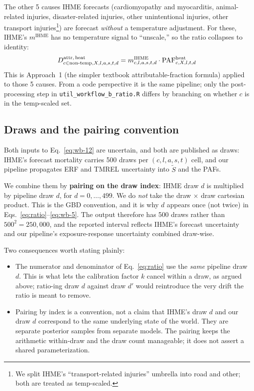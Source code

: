 \documentclass[11pt]{article}
\newcommand{\PAF}{\text{PAF}}
\newcommand{\mIHME}{m^{\text{IHME}}}
\begin{document}
The other 5 causes IHME forecasts (cardiomyopathy and myocarditis,
animal-related injuries, disaster-related injuries, other unintentional
injuries, other transport injuries\footnote{We split IHME's
``transport-related injuries'' umbrella into road and other; both are
treated as temp-scaled.}) are forecast \emph{without} a temperature
adjustment. For these, IHME's $\mIHME$ has no temperature signal to
``unscale,'' so the ratio collapses to identity:
\begin{equation}
\mAttr[heat]_{c \in \text{non-temp}, X, l, a, s, t, d}
= \mIHME_{c,l,a,s,t,d} \cdot \PAF^{\text{heat}}_{c,X,l,t,d}
\label{eq:wb-5}
\end{equation}
This is Approach~1 (the simpler textbook attributable-fraction formula)
applied to those 5 causes. From a code perspective it is the same
pipeline; only the post-processing step in
\texttt{util\_workflow\_b\_ratio.R} differs by branching on whether
$c$ is in the temp-scaled set.

\subsection{Draws and the pairing convention}
\label{sec:draws}

Both inputs to Eq.~\eqref{eq:wb-12} are uncertain, and both are published
as draws: IHME's forecast mortality carries 500 draws per
$(c, l, a, s, t)$ cell, and our pipeline propagates ERF and TMREL
uncertainty into $\tilde S$ and the PAFs.

We combine them by \textbf{pairing on the draw index}: IHME draw $d$ is
multiplied by pipeline draw $d$, for $d = 0, \ldots, 499$. We do
\emph{not} take the draw $\times$ draw cartesian product. This is the GBD
convention, and it is why $d$ appears once (not twice) in
Eqs.~\eqref{eq:ratio}--\eqref{eq:wb-5}. The output therefore has 500
draws rather than $500^2 = 250{,}000$, and the reported interval reflects
IHME's forecast uncertainty and our pipeline's exposure-response
uncertainty combined draw-wise.

Two consequences worth stating plainly:
\begin{itemize}[itemsep=2pt]
  \item The numerator and denominator of Eq.~\eqref{eq:ratio} use the
    \emph{same} pipeline draw $d$. This is what lets the calibration
    factor $k$ cancel within a draw, as argued above; ratio-ing draw $d$
    against draw $d'$ would reintroduce the very drift the ratio is meant
    to remove.
  \item Pairing by index is a convention, not a claim that IHME's draw
    $d$ and our draw $d$ correspond to the same underlying state of the
    world. They are separate posterior samples from separate models. The
    pairing keeps the arithmetic within-draw and the draw count
    manageable; it does not assert a shared parameterization.
\end{itemize}
\end{document}
